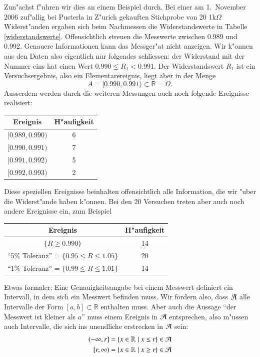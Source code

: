 Zun"achst f"uhren wir dies an einem Beispiel durch.
Bei einer am 1.~November 2006
zuf"allig bei Pusterla in Z"urich gekauften Stichprobe von 20 1k$\Omega$
Widerst"anden ergaben sich beim Nachmessen die Widerstandswerte in 
Tabelle \ref{widerstandswerte}. Offensichtlich streuen die Messwerte
zwischen 0.989 und 0.992. Genauere Informationen kann das Messger"at nicht
anzeigen. Wir k"onnen aus den Daten also eigentlich nur folgendes schliessen:
der Widerstand mit der Nummer eins hat einen Wert $0.990\le R_1<0.991$.
Der Widerstandswert $R_1$ ist ein Versuchsergebnis, also ein Elementarereignis,
liegt aber in der Menge
\[
A=[0.990,0.991)\subset \mathbb{R}=\Omega.
\]
Ausserdem werden durch die weiteren Messungen auch noch folgende
Ereignisse realisiert:
\begin{center}
\begin{tabular}{|c|c|}
\hline
Ereignis&H"aufigkeit\\
\hline
$[0.989,0.990)$&6\\
$[0.990,0.991)$&7\\
$[0.991,0.992)$&5\\
$[0.992,0.993)$&2\\
\hline
\end{tabular}
\end{center}
Diese speziellen Ereignisse beinhalten offensichtlich alle Information,
die wir "uber die Widerst"ande haben k"onnen.
Bei den 20 Versuchen treten aber auch noch andere Ereignisse ein,
zum Beispiel
\begin{center}
\begin{tabular}{|c|c|}
\hline
Ereignis&H"aufigkeit\\
\hline
$\{R\ge 0.990\}$&14\\
``5\% Toleranz'' = $\{0.95\le R\le1.05\}$&20\\
``1\% Toleranz'' = $\{0.99\le R\le 1.01\}$&14\\
\hline
\end{tabular}
\end{center}

Etwas formaler: Eine Genauigkeitsangabe bei einem Messwert definiert
ein Intervall, in dem sich ein Messwert befinden muss. Wir
fordern also, dass $\cal A$ alle Intervalle der Form $[a,b]\subset\mathbb R$
enthalten muss.
Aber auch die Aussage ``der Messwert ist kleiner als $a$''
muss einem Ereignis in $\cal A$ entsprechen, also m"ussen auch Intervalle,
die sich ins unendliche erstrecken in $\cal A$ sein:
\begin{align*}{}
(-\infty,r]&=\{x\in\mathbb R\;|\;x \le r\} \in \cal A\\
\;[r,\infty)&=\{x\in\mathbb R\;|\;x \ge r\} \in \cal A
\end{align*}

